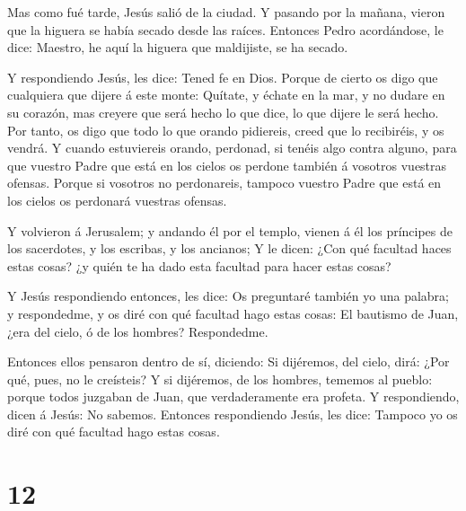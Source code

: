  Mas como fué tarde, Jesús salió de la ciudad.
 Y pasando por la mañana, vieron que la higuera se había
secado desde las raíces.  Entonces Pedro acordándose, le
dice: Maestro, he aquí la higuera que maldijiste, se ha secado.

 Y respondiendo Jesús, les dice: Tened fe en Dios.
 Porque de cierto os digo que cualquiera que dijere á este
monte: Quítate, y échate en la mar, y no dudare en su corazón, mas
creyere que será hecho lo que dice, lo que dijere le será hecho.
 Por tanto, os digo que todo lo que orando pidiereis, creed
que lo recibiréis, y os vendrá.  Y cuando estuviereis
orando, perdonad, si tenéis algo contra alguno, para que vuestro Padre
que está en los cielos os perdone también á vosotros vuestras ofensas.
 Porque si vosotros no perdonareis, tampoco vuestro Padre
que está en los cielos os perdonará vuestras ofensas.

 Y volvieron á Jerusalem; y andando él por el templo,
vienen á él los príncipes de los sacerdotes, y los escribas, y los
ancianos;  Y le dicen: ¿Con qué facultad haces estas cosas?
¿y quién te ha dado esta facultad para hacer estas cosas?

 Y Jesús respondiendo entonces, les dice: Os preguntaré
también yo una palabra; y respondedme, y os diré con qué facultad hago
estas cosas:  El bautismo de Juan, ¿era del cielo, ó de los
hombres? Respondedme.

 Entonces ellos pensaron dentro de sí, diciendo: Si
dijéremos, del cielo, dirá: ¿Por qué, pues, no le creísteis?
 Y si dijéremos, de los hombres, tememos al pueblo: porque
todos juzgaban de Juan, que verdaderamente era profeta.  Y
respondiendo, dicen á Jesús: No sabemos. Entonces respondiendo Jesús,
les dice: Tampoco yo os diré con qué facultad hago estas cosas.

\hypertarget{section-11}{%
\section{12}\label{section-11}}

